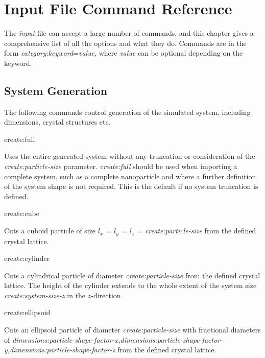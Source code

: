 \chapter{Input File Command Reference}\label{chap:InputFileCommandReference}
The \textit{input} file can accept a large number of commands, and this chapter gives a comprehensive list of all the options and what they do. Commands are in the form \textit{category}:\textit{keyword}=\textit{value}, where \textit{value} can be optional depending on the keyword. 

\section*{System Generation}
The following commands control generation of the simulated system, including dimensions, crystal structures etc. \\ \par

{\zicf create:full} Uses the entire generated system without any truncation or consideration of the \textit{create:particle-size} parameter. \textit{create:full} should be used when importing a complete system, such as a complete nanoparticle and where a further definition of the system shape is not required. This is the default if no system truncation is defined.\\ \par

{\zicf create:cube} Cuts a cuboid particle of size \textit{$l_x$ = $l_y$ = $l_z$ = create:particle-size} from the defined crystal lattice.\\ \par

{\zicf create:cylinder} Cuts a cylindrical particle of diameter \textit{create:particle-size} from the defined crystal lattice. The height of the cylinder extends to the whole extent of the system size \textit{create:system-size-z} in the $z$-direction. \\ \par

{\zicf create:ellipsoid} Cuts an ellipsoid particle of diameter \textit{create:particle-size} with fractional diameters of \textit{dimensions:particle-shape-factor-x,dimensions:particle-shape-factor-y,dimensions:particle-shape-factor-z} from the defined crystal lattice.\\ \par

